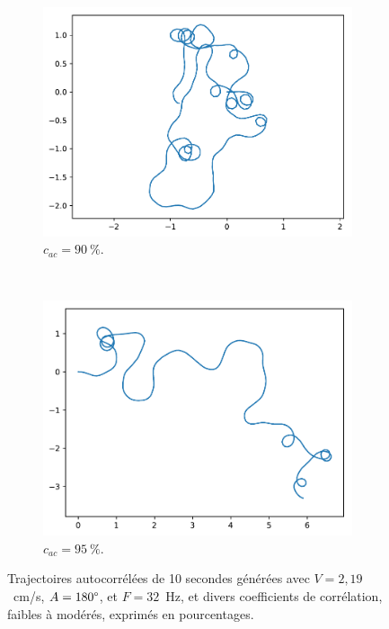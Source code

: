 \begin{appendices}
\begin{figure}[htb]
		\begin{subfigure}[t]{\subImgWarea}
			\centering
			\includegraphics[width=\textwidth]{figures/ch3/2_19_autocorr_2_19_180_32_0_9}
			\caption{$c_{ac} = 90~\%$.}
			\label{fig:2_19_autocorr_2_19_180_32_0_9}
		\end{subfigure}
		~
		\begin{subfigure}[t]{\subImgWarea}
			\centering
			\includegraphics[width=\textwidth]{figures/ch3/2_19_autocorr_2_19_180_32_0_95}
			\caption{$c_{ac} = 95~\%$.}
			\label{fig:2_19_autocorr_2_19_180_32_0_95}
		\end{subfigure}
		\caption[Trajectoires autocorrélées]{Trajectoires autocorrélées de 10 secondes générées avec $V = 2,19$~cm/s, $A = 180\degree$, et $F = 32$~Hz, et divers coefficients de corrélation, faibles à modérés, exprimés en pourcentages.}
		\label{fig:realAutocorr}
	\end{figure}
	

\end{appendices}
